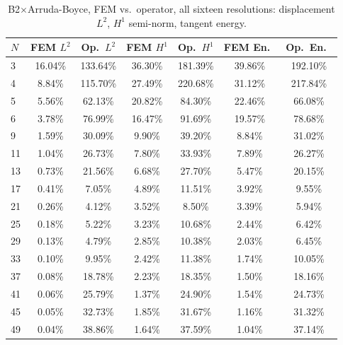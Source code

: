 \documentclass[final,5p,times]{elsarticle}
\begin{document}
\begin{table}[ht]
\centering
\caption{B2$\times$Arruda-Boyce, FEM vs.\ operator, all sixteen
  resolutions: displacement $L^2$, $H^1$ semi-norm, tangent energy.}
\label{tab:b1-b2ab-a}
\scriptsize
\begin{tabular}{lcccccc}
\toprule
$N$ & FEM $L^2$ & Op.\ $L^2$ & FEM $H^1$ & Op.\ $H^1$ & FEM En.\ & Op.\ En.\ \\
\midrule
3  & 16.04\% & 133.64\% & 36.30\% & 181.39\% & 39.86\% & 192.10\% \\
4  & 8.84\%  & 115.70\% & 27.49\% & 220.68\% & 31.12\% & 217.84\% \\
5  & 5.56\%  & 62.13\%  & 20.82\% & 84.30\%  & 22.46\% & 66.08\%  \\
6  & 3.78\%  & 76.99\%  & 16.47\% & 91.69\%  & 19.57\% & 78.68\%  \\
9  & 1.59\%  & 30.09\%  & 9.90\%  & 39.20\%  & 8.84\%  & 31.02\%  \\
11 & 1.04\%  & 26.73\%  & 7.80\%  & 33.93\%  & 7.89\%  & 26.27\%  \\
13 & 0.73\%  & 21.56\%  & 6.68\%  & 27.70\%  & 5.47\%  & 20.15\%  \\
17 & 0.41\%  & 7.05\%   & 4.89\%  & 11.51\%  & 3.92\%  & 9.55\%   \\
21 & 0.26\%  & 4.12\%   & 3.52\%  & 8.50\%   & 3.39\%  & 5.94\%   \\
25 & 0.18\%  & 5.22\%   & 3.23\%  & 10.68\%  & 2.44\%  & 6.42\%   \\
29 & 0.13\%  & 4.79\%   & 2.85\%  & 10.38\%  & 2.03\%  & 6.45\%   \\
33 & 0.10\%  & 9.95\%   & 2.42\%  & 11.38\%  & 1.74\%  & 10.05\%  \\
37 & 0.08\%  & 18.78\%  & 2.23\%  & 18.35\%  & 1.50\%  & 18.16\%  \\
41 & 0.06\%  & 25.79\%  & 1.37\%  & 24.90\%  & 1.54\%  & 24.73\%  \\
45 & 0.05\%  & 32.73\%  & 1.85\%  & 31.67\%  & 1.16\%  & 31.32\%  \\
49 & 0.04\%  & 38.86\%  & 1.64\%  & 37.59\%  & 1.04\%  & 37.14\%  \\
\bottomrule
\end{tabular}
\end{table}
\end{document}
